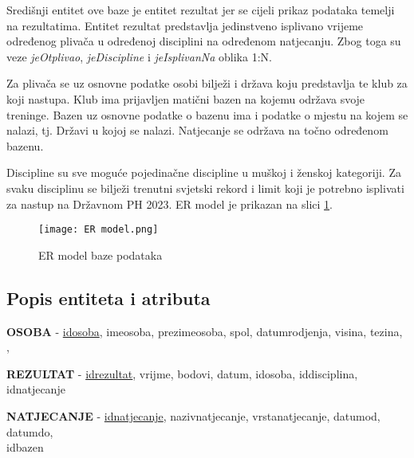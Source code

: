 \documentclass[times, utf8, zavrsni]{fer}
\begin{document}
Središnji entitet ove baze je entitet rezultat jer se cijeli prikaz podataka temelji na rezultatima. Entitet rezultat predstavlja jedinstveno isplivano vrijeme određenog plivača
u određenoj disciplini na određenom natjecanju. Zbog toga su veze \textit{jeOtplivao}, \textit{jeDiscipline} i \textit{jeIsplivanNa} oblika 1:N. 

\vspace{\baselineskip}

Za plivača se uz osnovne podatke osobi bilježi i država koju predstavlja te klub za koji nastupa. Klub ima prijavljen matični bazen na kojemu održava svoje treninge.
Bazen uz osnovne podatke o bazenu ima i podatke o mjestu na kojem se nalazi, tj. Državi u kojoj se nalazi. Natjecanje se održava na točno određenom bazenu.

\vspace{\baselineskip}

Discipline su sve moguće pojedinačne discipline u muškoj i ženskoj kategoriji. Za svaku disciplinu se bilježi trenutni svjetski rekord i limit koji je potrebno isplivati
za nastup na Državnom PH 2023. ER model je prikazan na slici \ref*{fig:ER model}.

\clearpage

\begin{figure}[!h]
    \centering
    \hspace*{-2.5cm}\texttt{[image: ER model.png]}
    \centering
    \caption{ER model baze podataka}
    \label{fig:ER model}
\end{figure}

\subsection{Popis entiteta i atributa}

\vspace{\baselineskip}

\textbf{OSOBA} - \underline{idosoba}, imeosoba, prezimeosoba, spol, datumrodjenja, visina, tezina, , 

\vspace{\baselineskip}

\textbf{REZULTAT} - \underline{idrezultat}, vrijme, bodovi, datum, idosoba, iddisciplina, idnatjecanje

\vspace{\baselineskip}

\textbf{NATJECANJE} - \underline{idnatjecanje}, nazivnatjecanje, vrstanatjecanje, datumod, datumdo, \\
\indent idbazen
\end{document}
